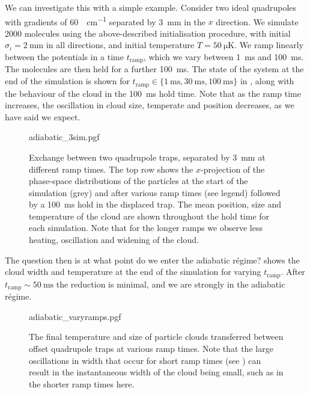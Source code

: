 We can investigate this with a simple example.  Consider two ideal quadrupoles
with gradients of \SI{60}{\gauss\per\centi\meter} separated by
\SI{3}{\milli\meter} in the $x$ direction. We simulate 2000 \CaF{} molecules
using the above-described initialisation procedure, with initial $\sigma_i =
\SI{2}{\milli\meter}$ in all directions, and initial temperature
$T=\SI{50}{\micro\kelvin}$. We ramp linearly between the potentials in a time
$t_\text{ramp}$, which we vary between \SI{1}{\milli\second} and
\SI{100}{\milli\second}. The molecules are then held for a further
\SI{100}{\milli\second}. The state of the system at the end of the simulation
is shown for $t_\text{ramp}\in \{\SI{1}{\milli\second}, \SI{30}{\milli\second},
\SI{100}{\milli\second}\}$ in , along with the
behaviour of the cloud in the \SI{100}{\milli\second} hold time. Note that as
the ramp time increases, the oscillation in cloud size, temperate and position
decreases, as we have said we expect.

\begin{figure}[p]
\centering
  {adiabatic_3sim.pgf}
  \caption{
    Exchange between two quadrupole traps, separated by \SI{3}{\milli\meter} at
    different ramp times. The top row shows the $x$-projection of the
    phase-space distributions of the particles at the start of the simulation
    (grey) and after various ramp times (see legend) followed by a
    \SI{100}{\milli\second} hold in the displaced trap. The mean position, size and
    temperature of the cloud are shown throughout the hold time for each
    simulation. Note that for the longer ramps we observe less heating,
    oscillation and widening of the cloud.
  }
  \label{design:fig:adia3sim}
\end{figure}


The question then is at what point do we enter the adiabatic r\'egime?
 shows the cloud width and temperature at the end
of the simulation for varying $t_\text{ramp}$. After
$t_\text{ramp}\sim\SI{50}{\milli\second}$ the reduction is minimal, and we are
strongly in the adiabatic r\'egime.

\begin{figure}[t!]
\centering
  {adiabatic_varyramps.pgf}
  \caption{
    The final temperature and size of particle clouds transferred between
    offset quadrupole traps at various ramp times. Note that the large
    oscillations in width that occur for short ramp times (see
    ) can result in the instantaneous width of
    the cloud being small, such as in the shorter ramp times here.
  }
  \label{design:fig:adiavary}
\end{figure}

